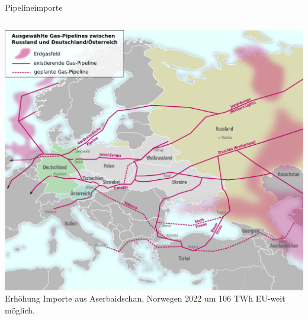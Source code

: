 \documentclass[10pt]{beamer}
\begin{document}
\begin{frame}{Pipelineimporte}
\begin{columns}
\includegraphics[width=\textwidth]{fig/gaspipelines.png}
\scriptsize{}
Erhöhung Importe aus Aserbaidschan, Norwegen 2022 um 106 TWh EU-weit möglich.

\centering
\smallskip
\scriptsize{}
\end{columns}
\end{frame}
\end{document}
